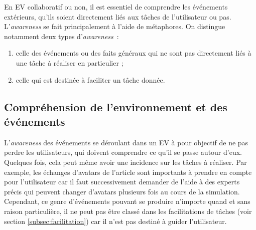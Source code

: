 \documentclass[11pt]{article}
\begin{document}
En EV collaboratif ou non, il est essentiel de comprendre les événements extérieurs, qu'ils soient directement liés aux tâches de l'utilisateur ou pas. L'\textit{awareness} se fait principalement à l'aide de métaphores. On distingue notamment deux types d'\textit{awareness}~:
\begin{enumerate}
	\item celle des événements ou des faits généraux qui ne sont pas directement liés à une tâche à réaliser en particulier ;
	\item celle qui est destinée à faciliter un tâche donnée.
\end{enumerate}

\subsection{Compréhension de l'environnement et des événements}
L'\textit{awareness} des événements se déroulant dans un EV à pour objectif de ne pas perdre les utilisateurs, qui doivent comprendre ce qu'il se passe autour d'eux. Quelques fois, cela peut même avoir une incidence sur les tâches à réaliser. Par exemple, les échanges d'avatars de l'article \cite{avatars} sont importants à prendre en compte pour l'utilisateur car il faut successivement demander de l'aide à des experts précis qui peuvent changer d'avatars plusieurs fois au cours de la simulation. Cependant, ce genre d'événements pouvant se produire n'importe quand et sans raison particulière, il ne peut pas être classé dans les facilitations de tâches (voir section \ref{subsec:facilitation}) car il n'est pas destiné à guider l'utilisateur.
\\
\end{document}
